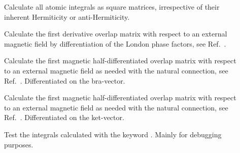\begin{description}
\item[] Calculate all atomic integrals as square
matrices, irrespective of their inherent Hermiticity or
anti-Hermiticity.

\item[] Calculate the first derivative overlap
matrix with respect to an
external magnetic field by differentiation
of the London phase factors, see Ref.~\cite{thpjjcp95}.


\item[] Calculate the first magnetic half-differentiated overlap
matrix with respect to an
external magnetic field as needed with the
natural connection, see
Ref.~\cite{krthklbpjjocp195}. Differentiated
on the bra-vector.


\item[] Calculate the first magnetic half-differentiated overlap
matrix with respect to an external magnetic field as needed with the
natural connection, see Ref.~\cite{krthklbpjjocp195}. Differentiated on
the ket-vector.


\item[] Test the integrals calculated with the keyword
. Mainly for debugging purposes.


\end{description}
